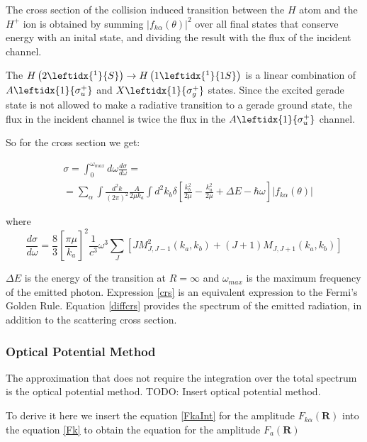 The cross section of the collision induced transition between the $ H $ atom and the $ H^{+} $ ion is obtained by summing $ \left|f_{k\alpha}(\theta)\right|^2 $ over all final states that conserve energy with an inital state, and dividing the result with the flux of the incident channel.

The $ H\left(2 \leftidx{^1}{S}\right) \rightarrow H\left(1 \leftidx{^1}{1S}\right) $ is a linear combination of $ A \leftidx{1}{\sigma_u^{+}} $ and $ X \leftidx{1}{\sigma_g^{+}} $ states. Since the excited gerade state is not allowed to make a radiative transition to a gerade ground state, the flux in the incident channel is twice the flux in the $ A \leftidx{1}{\sigma_u^{+}} $ channel.

So for the cross section we get:

\begin{equation}\label{crs}
\begin{split}
& \sigma = \int_0^{\omega_{max}}{d\omega\frac{d\sigma}{d\omega}} = \\[.8em]
& = \sum_{\alpha}{\int{\frac{d^2k}{(2\pi)^2}\frac{A}{2\mu k_a}\int{d^2k_b\delta\left[\frac{k_b^2}{2\mu} - \frac{k_a^2}{2\mu} + \Delta E - \hbar\omega \right]\left|f_{k\alpha}(\theta) \right| } } }
\end{split}
\end{equation}

where
\begin{equation}\label{diffcrs}
\frac{d\sigma}{d\omega} = \frac{8}{3}\left[\frac{\pi \mu}{k_a}\right]^2 \frac{1}{c^3}\omega^3 \sum_{J}{\left[J M_{J,J-1}^2(k_a,k_b) + (J+1)M_{J,J+1}(k_a,k_b)\right] }
\end{equation}

$ \Delta E $ is the energy of the transition at $ R = \infty $ and $ \omega_{max} $ is the maximum frequency of the emitted photon. Expression \eqref{crs} is an equivalent expression to the Fermi's Golden Rule. Equation \eqref{diffcrs} provides the spectrum of the emitted radiation, in addition to the scattering cross section. 

\subsubsection{Optical Potential Method}

The approximation that does not require the integration over the total spectrum is the optical potential method. TODO: Insert optical potential method.

To derive it here we insert the equation \eqref{FkaInt} for the amplitude $ F_{k\alpha}(\mathbf{R}) $ into the equation \eqref{Fk} to obtain the equation for the amplitude $ F_a(\mathbf{R}) $

